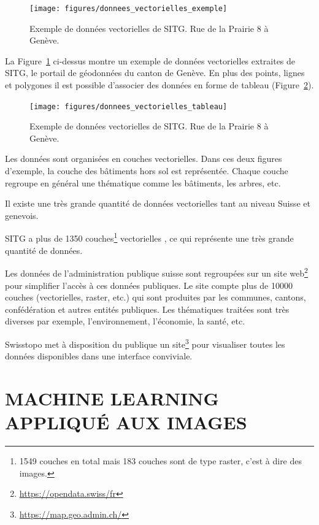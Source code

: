\begin{figure}[htbp]
    \centering
    \texttt{[image: figures/donnees\_vectorielles\_exemple]}
    \caption{Exemple de données vectorielles de SITG. Rue de la Prairie 8 à Genève.}
    \label{fig:donnees_vectorielles_exemple}
\end{figure}

La Figure~\ref{fig:donnees_vectorielles_exemple} ci-dessus montre un exemple de données vectorielles extraites de SITG, le portail de géodonnées du canton de Genève. En plus des points, lignes et polygones il est possible d'associer des données en forme de tableau (Figure~\ref{fig:donnees_vectorielles_tableau}).

\begin{figure}[htbp]
    \centering
    \texttt{[image: figures/donnees\_vectorielles\_tableau]}
    \caption{Exemple de données vectorielles de SITG. Rue de la Prairie 8 à Genève.}
    \label{fig:donnees_vectorielles_tableau}
\end{figure}

Les données sont organisées en couches vectorielles. Dans ces deux figures d'exemple, la couche des bâtiments hors sol est représentée. Chaque couche regroupe en général une thématique comme les bâtiments, les arbres, etc.

Il existe une très grande quantité de données vectorielles tant au niveau Suisse et genevois.

SITG a plus de 1350 couches\footnote{1549 couches en total mais 183 couches sont de type raster, c'est à dire des images.} vectorielles \citep{sitg_chiffres_2024}, ce qui représente une très grande quantité de données.

Les données de l'administration publique suisse sont regroupées sur un site web\footnote{\url{https://opendata.swiss/fr}} pour simplifier l'accès à ces données publiques. Le site compte plus de 10000 couches (vectorielles, raster, etc.) qui sont produites par les communes, cantons, confédération et autres entités publiques. Les thématiques traitées sont très diverses par exemple, l'environnement, l'économie, la santé, etc.

Swisstopo met à disposition du publique un site\footnote{\url{https://map.geo.admin.ch/}} pour visualiser toutes les données disponibles dans une interface conviviale.

\section{MACHINE LEARNING APPLIQUÉ AUX IMAGES}


